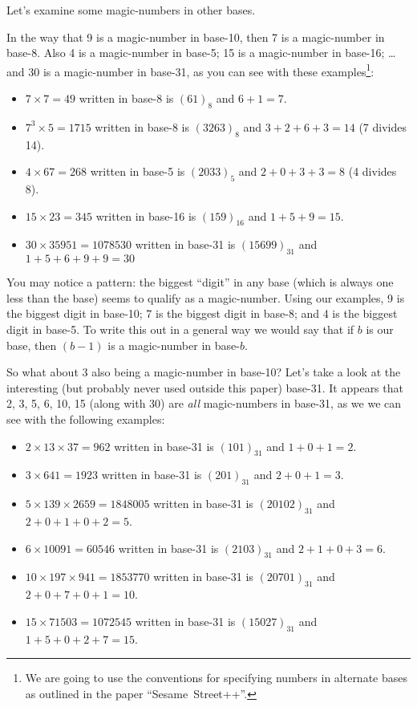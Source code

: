 \documentclass{article}
\begin{document}
Let's examine some magic-numbers in other bases.

In the way that 9 is a magic-number in base-10, then 7 is a magic-number in base-8.
Also 4 is a magic-number in base-5;
15 is a magic-number in base-16;
\dots{}and 30 is a magic-number in base-31, as you can see with these
examples\footnote{We are going to use the conventions for specifying
numbers in alternate bases as outlined in the paper ``Sesame~Street++''.}:
\begin{itemize}
\item $7\times{}7=49$ written in base-8 is $(61)_8$ and $6+1=7$.
\item $7^3\times{}5=1715$ written in base-8 is $(3263)_8$ and $3+2+6+3=14$ (7 divides 14).
\item $4\times{}67=268$ written in base-5 is $(2033)_5$ and $2+0+3+3=8$ (4 divides 8).
\item $15\times{}23=345$ written in base-16 is $(159)_{16}$ and $1+5+9=15$.
\item $30\times{}35951=1078530$ written in base-31 is $(15699)_{31}$ and $1+5+6+9+9=30$
\end{itemize}

You may notice a pattern: the biggest ``digit'' in any base
(which is always one less than the base) seems to
qualify as a magic-number.
Using our examples, 9 is the biggest
digit in base-10; 7 is the biggest digit in base-8; and 4 is the biggest digit in base-5.
To write this out in a general way
we would say that if $b$ is our base, then $(b-1)$ is a magic-number in base-$b$.

So what about 3 also being a magic-number in base-10?
Let's take a look at the interesting (but probably never used outside this paper) base-31.
It appears that 2, 3, 5, 6, 10, 15 (along with 30)
are \emph{all} magic-numbers in base-31, as we we can see
with the following examples:
\begin{itemize}
\item $2\times{}13\times{}37=962$ written in base-31 is $(101)_{31}$ and $1+0+1=2$.
\item $3\times{}641=1923$ written in base-31 is $(201)_{31}$ and $2+0+1=3$.
\item $5\times{}139\times{}2659=1848005$ written in base-31 is $(20102)_{31}$ and $2+0+1+0+2=5$.
\item $6\times{}10091=60546$ written in base-31 is $(2103)_{31}$ and $2+1+0+3=6$.
\item $10\times{}197\times{}941=1853770$ written in base-31 is $(20701)_{31}$ and $2+0+7+0+1=10$.
\item $15\times{}71503=1072545$ written in base-31 is $(15027)_{31}$ and $1+5+0+2+7=15$.
\end{itemize}
\end{document}
